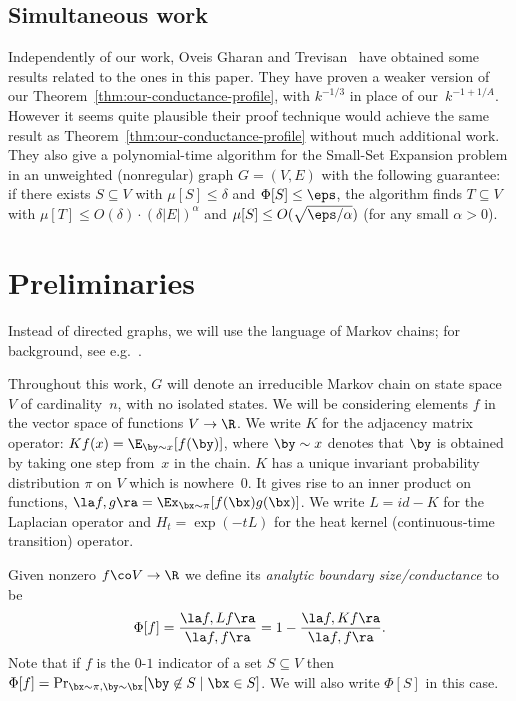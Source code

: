 \documentclass[11pt]{article}
\newcommand{\Bdry}{\Phi}
\newcommand{\Spars}{\mu}
\begin{document}
{\subsection{Simultaneous work}
Independently of our work, Oveis Gharan and Trevisan~\cite{OT12} have obtained some results related to the ones in this paper.  They have proven a weaker version of our Theorem~\ref{thm:our-conductance-profile}, with $k^{-1/3}$ in place of our~$k^{-1+1/A}$.  However it seems quite plausible their proof technique would achieve the same result as Theorem~\ref{thm:our-conductance-profile} without much additional work.  They also give a polynomial-time algorithm for the Small-Set Expansion problem in an unweighted (nonregular) graph $G = (V,E)$ with the following guarantee:  if there exists $S \subseteq V$ with $\Spars[S] \leq \delta$ and $\Bdry[S] \leq \eps$, the algorithm finds $T \subseteq V$ with $\Spars[T] \leq O(\delta) \cdot (\delta |E|)^{\alpha}$ and $\Spars[S] \leq O(\sqrt{\eps/\alpha})$ (for any small $\alpha > 0$).
}



\section{Preliminaries}                 \label{sec:prelims}
Instead of directed graphs, we will use the language of Markov chains; for background, see e.g.~\cite{DS96,MT06}.

Throughout this work, $G$ will denote an irreducible Markov chain on state space~$V$ of cardinality~$n$, with no isolated states.  We will be considering elements $f$ in the vector space of functions $V \to \R$. We  write $K$ for the adjacency matrix operator: $Kf(x) = \E_{\by \sim x}[f(\by)]$, where $\by \sim x$ denotes that $\by$ is obtained by taking one step from~$x$ in the chain.  $K$ has a unique invariant probability distribution $\pi$ on $V$ which is nowhere~$0$. It gives rise to an inner product on functions, $\la f, g \ra = \Ex_{\bx \sim \pi}[f(\bx)g(\bx)]$.  We write $L = id - K$  for the Laplacian operator and $H_t = \exp(-tL)$ for the heat kernel (continuous-time transition) operator.

\begin{definition}
    Given nonzero $f \co V \to \R$ we define its \emph{analytic boundary size/conductance} to be
    \[
        \Bdry[f] = \frac{\la f, L f \ra}{\la f, f \ra} = 1 - \frac{\la f, K f \ra}{\la f, f \ra}.
    \]
    Note that if $f$ is the $0$-$1$ indicator of a set $S \subseteq V$ then $\Phi[f] = \Pr_{\bx \sim \pi, \by \sim \bx}[\by \not \in S \mid \bx \in S]$.  We will also write $\Phi[S]$ in this case.
\end{definition}
\end{document}
